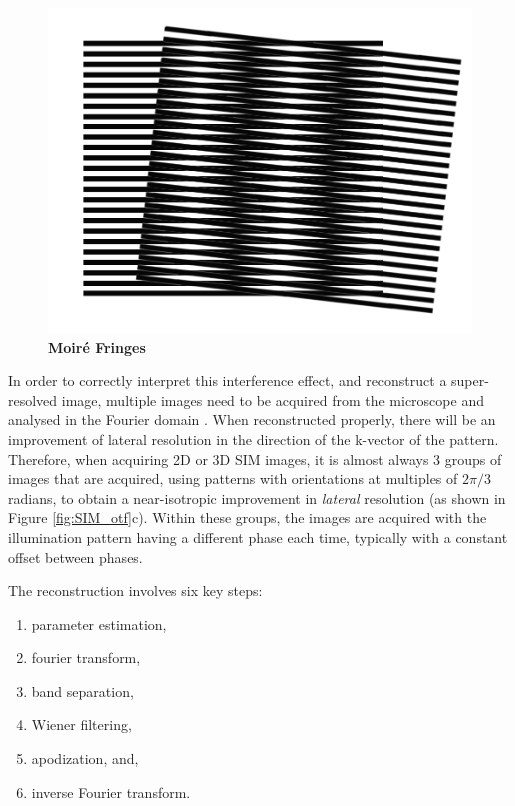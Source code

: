 \documentclass[12pt]{article}
\begin{document}
\begin{figure}[hbtp]
    \includegraphics[scale=0.5, center]{figures/moire.png}
    \caption{\textbf{Moir\'{e} Fringes}}
    \label{fig:moire}
\end{figure}

In order to correctly interpret this interference effect, and reconstruct a super-resolved image,
multiple images need to be acquired from the microscope and analysed in the Fourier domain \cite{SIM2008}.
When reconstructed properly, there will be an improvement of lateral resolution in the direction of the k-vector of the pattern.
Therefore, when acquiring 2D or 3D SIM images, it is almost always 3 groups of images that are acquired,
using patterns with orientations at multiples of $2\pi/3$ radians,
to obtain a near-isotropic improvement in \textit{lateral} resolution (as shown in Figure \ref{fig:SIM_otf}c).
Within these groups, the images are acquired with the illumination pattern having a different phase each time,
typically with a constant offset between phases.

The reconstruction involves six key steps:

\begin{enumerate}
    \item parameter estimation,
    \item fourier transform,
    \item band separation,
    \item Wiener filtering,
    \item apodization, and,
    \item inverse Fourier transform.
\end{enumerate}
\end{document}
